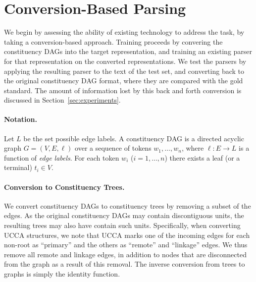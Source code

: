 \documentclass[11pt]{article}
\newcommand{\secref}[1]{Section~\ref{#1}}
\begin{document}




\section{Conversion-Based Parsing}\label{sec:conversion_approach}

We begin by assessing the ability of existing technology to address the task,
by taking a conversion-based approach. Training proceeds by 
convering the constituency DAGs into the target representation,
and training an existing parser for that representation on the converted representations.
We test the parsers by applying the resulting parser to the text of the test set,
and converting back to the original constituency DAG format, where they are compared
with the gold standard.
The amount of information lost by this back and forth conversion is discussed in
\secref{sec:experiments}.

\paragraph{Notation.}
Let $L$ be the set possible edge labels.
A constituency DAG is a directed acyclic graph $G=(V,E, \ell)$
over a sequence of tokens $w_1, \ldots, w_n$,
where $\ell:E\to L$ is a function of \textit{edge labels}.
For each token $w_i$ ($i=1, \ldots, n$) there exists a leaf (or a terminal) $t_i \in V$.

\paragraph{Conversion to Constituency Trees.}
We convert constituency DAGs to constituency trees by removing a subset of the edges.
As the original constituency DAGs may contain discontiguous units, the resulting trees
may also have contain such units.
Specifically, when converting UCCA structures, we note that UCCA marks one of the incoming edges
for each non-root as ``primary'' and the others as ``remote'' and ``linkage'' edges.
We thus remove all remote and linkage edges, in addition to nodes that are disconnected
from the graph as a result of this removal. 
The inverse conversion from trees to graphs is simply the identity function.
\end{document}
